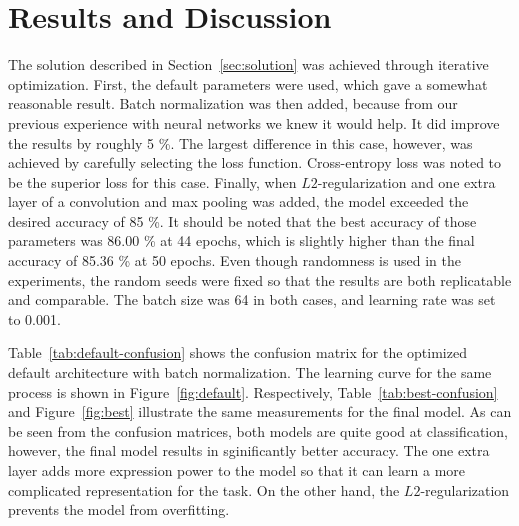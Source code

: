 \documentclass{article}
\begin{document}
\section{Results and Discussion}\label{sec:results}

The solution described in Section~\ref{sec:solution} was achieved
through iterative optimization. First, the default parameters were
used, which gave a somewhat reasonable result. Batch normalization was
then added, because from our previous experience with neural networks
we knew it would help. It did improve the results by roughly 5 \%. The
largest difference in this case, however, was achieved by carefully
selecting the loss function. Cross-entropy loss was noted to be the
superior loss for this case. Finally, when $L2$-regularization and one
extra layer of a convolution and max pooling was added, the model
exceeded the desired accuracy of 85 \%. It should be noted that the
best accuracy of those parameters was 86.00 \% at 44 epochs, which is
slightly higher than the final accuracy of 85.36 \% at 50 epochs. Even
though randomness is used in the experiments, the random seeds were
fixed so that the results are both replicatable and comparable. The
batch size was 64 in both cases, and learning rate was set to 0.001.

Table~\ref{tab:default-confusion} shows the confusion matrix for the
optimized default architecture with batch normalization. The learning
curve for the same process is shown in Figure~\ref{fig:default}.
Respectively, Table~\ref{tab:best-confusion} and Figure~\ref{fig:best}
illustrate the same measurements for the final model. As can be seen
from the confusion matrices, both models are quite good at
classification, however, the final model results in sginificantly
better accuracy. The one extra layer adds more expression power to the
model so that it can learn a more complicated representation for the
task. On the other hand, the $L2$-regularization prevents the model
from overfitting.
\end{document}
